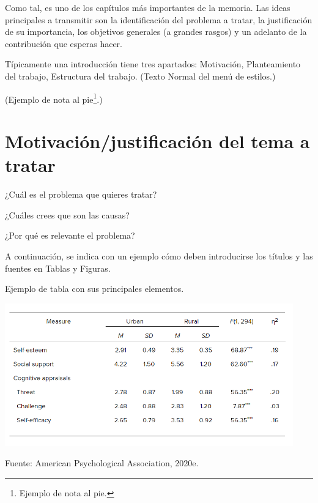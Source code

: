 Como tal, es uno de los capítulos más importantes de la memoria. Las ideas principales a transmitir son la identificación del problema a tratar, la justificación de su importancia, los objetivos generales (a grandes rasgos) y un adelanto de la contribución que esperas hacer.

Típicamente una introducción tiene tres apartados: Motivación, Planteamiento del trabajo, Estructura del trabajo. (Texto Normal del menú de estilos.)

(Ejemplo de nota al pie\footnote{Ejemplo de nota al pie.}.)

\section{Motivación/justificación del tema a tratar}

¿Cuál es el problema que quieres tratar?

¿Cuáles crees que son las causas?

¿Por qué es relevante el problema?

A continuación, se indica con un ejemplo cómo deben introducirse los títulos y las fuentes en Tablas y Figuras.

\begin{table}[t]
	\begin{center}
	\caption{Ejemplo de tabla con sus principales elementos.}
	\label{tab:tab-1}
	\includegraphics[width=4.90737in,height=2.42708in]{tabla}

	\small Fuente: American Psychological Association, 2020e.
	\end{center}
\end{table}

